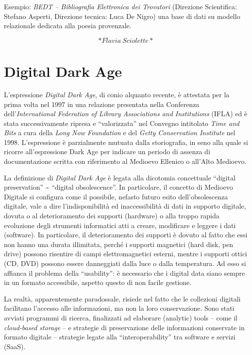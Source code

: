 \documentclass[
  b5paper,
  twoside,
  12pt,
  chapterprefix=false,
  bibliography=totocnumbered,
  parskip=false]{scrbook}
\begin{document}
Esempio: \emph{BEDT -- Bibliografia Elettronica dei Trovatori} (Direzione
Scientifica: Stefano Asperti, Direzione tecnica: Luca De Nigro) una base
di dati su modello relazionale dedicata alla poesia provenzale.

\[*Flavia~Sciolette*\]

\hypertarget{digital-dark-age}{%
\chapter{Digital Dark Age}\label{digital-dark-age}}

L'espressione \emph{Digital Dark Age}, di conio alquanto recente, è attestata
per la prima volta nel 1997 in una relazione presentata nella Conferenza
dell'\emph{International Federation of Library Associations and Institutions}
(IFLA) ed è stata successivamente ripresa e \enquote{valorizzata} nel Convegno
intitolato \emph{Time and Bits} a cura della \emph{Long Now Foundation} e del
\emph{Getty Conservation Institute} nel 1998. L'espressione è parzialmente
mutuata dalla storiografia, in seno alla quale si ricorre
all'espressione Dark Age per indicare un periodo di assenza di
documentazione scritta con riferimento al Medioevo Ellenico o all'Alto
Medioevo.

La definizione di \emph{Digital Dark Age} è legata alla dicotomia concettuale
\enquote{digital preservation} \textasciitilde{} \enquote{digital obsolescence}. In particolare, il
concetto di Medioevo Digitale si configura come il possibile, nefasto
futuro esito dell'obsolescenza digitale, vale a dire l'indisponibilità
ed inaccessibilità di dati in supporto digitale, dovuta o al
deterioramento dei supporti (hardware) o alla troppo rapida evoluzione
degli strumenti informatici atti a creare, modificare e leggere i dati
(software). In particolare, il deterioramento dei supporti è dovuto al
fatto che essi non hanno una durata illimitata, perché i supporti
magnetici (hard disk, pen drive) possono risentire di campi
elettromagnetici esterni, mentre i supporti ottici (CD, DVD) possono
essere danneggiati dalla luce o dalla temperatura. Ad esso si affianca
il problema della \enquote{usability}: è necessario che i digital data siano
sempre in un formato accessibile, aspetto questo di non facile gestione.

La realtà, apparentemente paradossale, risiede nel fatto che le
collezioni digitali facilitano l'accesso alle informazioni, ma non la
loro conservazione. Sono stati avviati programmi di ricerca, finalizzati
ad elaborare (analytic) tools -- come il \emph{cloud-based storage} -- e
strategie di preservazione delle informazioni conservate in formato
digitale -- strategie legate alla \enquote{interoperability} tra software e
servizi (SaaS).
\end{document}
